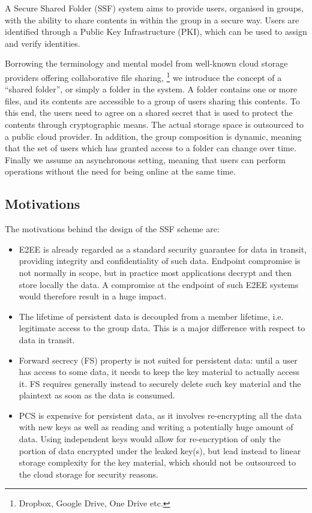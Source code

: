 A Secure Shared Folder (SSF) system aims to provide users, organised in groups, 
with the ability to share contents in within the group in a secure way.
Users are identified through a Public Key Infrastructure (PKI),
which can be used to assign and verify identities.

Borrowing the terminology and mental model from well-known cloud storage providers offering collaborative file sharing, 
\footnote{Dropbox, Google Drive, One Drive etc.}
we introduce the concept of a ``shared folder'', or simply a folder in the system.
A folder contains one or more files, and its contents are accessible to a group of users sharing this contents.
To this end, the users need to agree on a shared secret that is used to protect the contents through cryptographic means.
The actual storage space is outsourced to a public cloud provider.
In addition, the group composition is dynamic, meaning that the set of users which has granted access to a folder can change over time.
Finally we assume an asynchronous setting, meaning that users can
perform operations without the need for being online at the same time.

\subsection{Motivations}

The motivations behind the design of the SSF scheme are:
\begin{itemize}
    \item E2EE is already regarded as a standard security guarantee for data in transit, providing integrity and confidentiality of such data. Endpoint compromise is not normally in scope, but in practice most applications decrypt and then store locally the data. A compromise at the endpoint of such E2EE systems would therefore result in a huge impact.
    \item The lifetime of persistent data is decoupled from a member lifetime, i.e. legitimate access to the group data. This is a major difference with respect to data in transit.
    \item Forward secrecy (FS) property is not suited for persistent data: until a user has access to some data, it needs to keep the key material to actually access it. FS requires generally instead to securely delete such key material and the plaintext as soon as the data is consumed. 
    \item PCS is expensive for persistent data, as it involves re-encrypting all the data with new keys as well as reading and writing a potentially huge amount of data. Using independent keys would allow for re-encryption of only the portion of data encrypted under the leaked key(s), but lead instead to linear storage complexity for the key material, which should not be outsourced to the cloud storage for security reasons.
\end{itemize}

